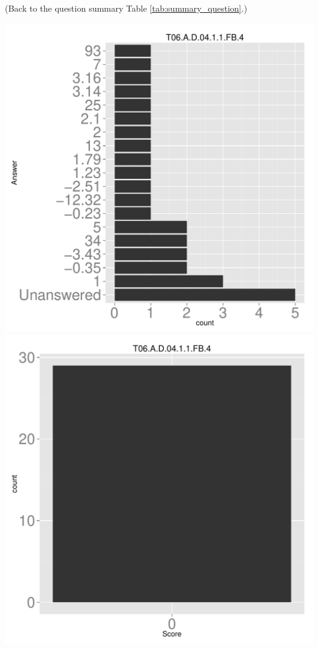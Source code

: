 \documentclass[12pt,nohyper]{tufte-handout}\usepackage[]{graphicx}\usepackage[]{color}
\begin{document}
 (Back to the question summary Table \ref{tab:summary_question}.)

\begin{center} \includegraphics[width=.45\linewidth]{Topic06_16_answer} \includegraphics[width=.45\linewidth]{Topic06_16_score} \end{center} 
\end{document}
